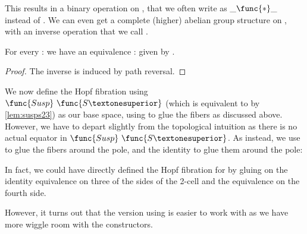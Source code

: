 This results in a binary operation on , that we often write
as \( \_\func{*}\_ \) instead of . We can even get a
complete (higher) abelian group structure on , with an
inverse operation that we call .
%
\begin{lemma}

  For every  :  we have an equivalence 
   :    given by  .
\end{lemma}
\begin{proof}
  The inverse is induced by path reversal.
\end{proof}

We now define the Hopf fibration using \( \func{Susp}\ \func{S¹} \)
(which is equivalent to  by \cref{lem:susps23}) as our base
space, using  to glue the fibers as discussed
above. However, we have to depart slightly from the topological
intuition as there is no actual equator in
\( \func{Susp}\ \func{S¹} \). As instead, we use  to glue
the fibers around the  pole, and the identity to glue them
around the  pole:
%

In fact, we could have directly defined the Hopf fibration for
 by gluing on the identity equivalence on three of the sides
of the 2-cell and the  equivalence on the fourth side.
%

However, it turns out that the version using   is
easier to work with as we have more wiggle room with the
constructors.

